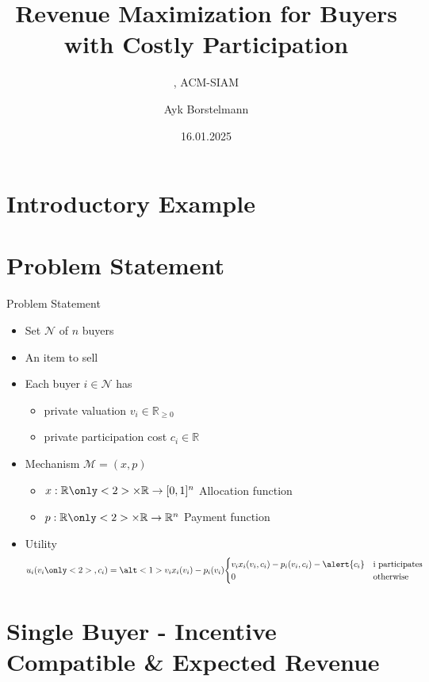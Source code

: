 \documentclass{beamer}
\title{Revenue Maximization for Buyers with Costly Participation}
\date{16.01.2025}
\author{Ayk Borstelmann}
\institute{
    Seminar Algorithmic Game Theory
}
\subtitle{
  \cite{primary}, ACM-SIAM
}
\begin{document}
\maketitle
\section{Introductory Example}
\section{Problem Statement}
\begin{frame}{Problem Statement}
  \begin{itemize}
    \item Set $\mathcal{N}$ of $n$ buyers
    \item An item to sell
    \item Each buyer $i \in \mathcal{N}$ has
          \begin{itemize}
            \item private valuation $v_i \in \mathbb{R}_{\geq0}$
            \item<2-> \alert{private participation cost $c_i \in \mathbb{R}$}
          \end{itemize}
    \item Mechanism $\mathcal{M} = (x,p)$
          \begin{itemize}
            \item $x: \mathbb{R} \only<2>{\times \mathbb{R}} \rightarrow [0,1]^n$ Allocation function
            \item $p: \mathbb{R} \only<2>{\times \mathbb{R}} \rightarrow \mathbb{R}^n$ Payment function
          \end{itemize}
    \item Utility
          \begin{align*}
            u_i(v_i\only<2>{, c_i}) = \alt<1>{v_i x_i(v_i) - p_i(v_i)}{\begin{cases}v_i x_i(v_i, c_i) - p_i(v_i, c_i) - \alert{c_i} & \text{i participates} \\ 0 & \text{otherwise}\end{cases}}
          \end{align*}
  \end{itemize}
\end{frame}
\section{Single Buyer - Incentive Compatible \& Expected Revenue}
\end{document}
